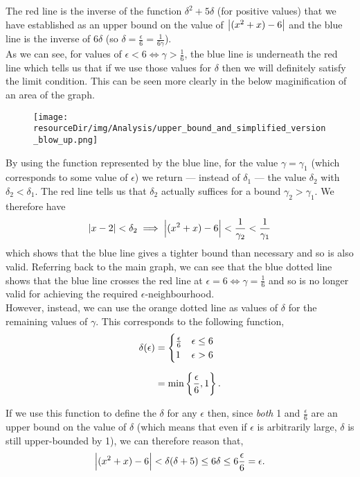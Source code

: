 \documentclass[../MathsNotesBase.tex]{subfiles}
\begin{document}
{\begin{exe}
{				The red line is the inverse of the function ${ \delta^2 + 5\delta }$ (for positive values) that we have established as an upper bound on the value of ${ \left\lvert(x^2 + x) - 6\right\rvert }$ and the blue line is the inverse of $6\delta$ (so ${ \delta = \frac{\epsilon}{6} = \frac{1}{6\gamma} }$).\\
				
				As we can see, for values of ${ \epsilon < 6 \iff \gamma > \frac{1}{6} }$, the blue line is underneath the red line which tells us that if we use those values for $\delta$ then we will definitely satisfy the limit condition. This can be seen more clearly in the below maginification of an area of the graph.\\
				\begin{figure}[h!]
					\centering
					\texttt{[image: \\resourceDir/img/Analysis/upper\_bound\_and\_simplified\_version\_blow\_up.png]}
				\end{figure}
				
				By using the function represented by the blue line, for the value ${ \gamma = \gamma_1 }$ (which corresponds to some value of $\epsilon$) we return --- instead of $\delta_1$ --- the value $\delta_2$ with ${ \delta_2 < \delta_1 }$. The red line tells us that $\delta_2$ actually suffices for a bound ${ \gamma_2 > \gamma_1 }$. We therefore have
				\[ \left\lvert x - 2\right\rvert < \delta_2 \implies \left\lvert(x^2 + x) - 6\right\rvert < \frac{1}{\gamma_2} < \frac{1}{\gamma_1} \]
				which shows that the blue line gives a tighter bound than necessary and so is also valid. Referring back to the main graph, we can see that the blue dotted line shows that the blue line crosses the red line at ${ \epsilon = 6 \iff \gamma = \frac{1}{6} }$ and so is no longer valid for achieving the required $\epsilon$-neighbourhood.\\
				
				However, instead, we can use the orange dotted line as values of $\delta$ for the remaining values of $\gamma$. This corresponds to the following function,
				\[\begin{aligned}
					\delta(\epsilon) &= 	\begin{cases}
												\frac{\epsilon}{6} & \epsilon \leq 6 \\
												1 & \epsilon > 6
											\end{cases} \nn
					&= \min \left\{ \frac{\epsilon}{6}, 1 \right\}.
				\end{aligned}\]
			
				If we use this function to define the $\delta$ for any $\epsilon$ then, since \textit{both} 1 and ${ \frac{\epsilon}{6} }$ are an upper bound on the value of $\delta$ (which means that even if $\epsilon$ is arbitrarily large, $\delta$ is still upper-bounded by 1), we can therefore reason that,
				\[ \left\lvert(x^2 + x) - 6\right\rvert < \delta (\delta + 5) \leq 6 \delta \leq 6 \frac{\epsilon}{6} = \epsilon. \]
			}
		\end{exe}
	}
\end{document}
